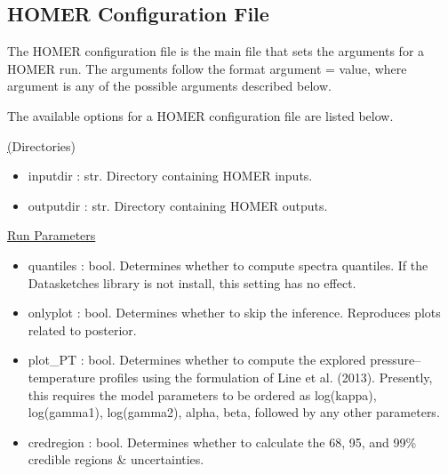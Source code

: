 \documentclass[letterpaper, 12pt]{article}
\begin{document}
\subsection{HOMER Configuration File}
\label{sec:config}
The HOMER configuration file is the main file that sets the arguments for a 
HOMER run. The arguments follow the format {\ttb argument = value}, where 
{\ttb argument} is any of the possible arguments described below. 

\noindent The available options for a HOMER configuration file are listed below.

\noindent \underline(Directories)
\begin{itemize}
\item inputdir   : str.  Directory containing HOMER inputs.
\item outputdir  : str.  Directory containing HOMER outputs.
\end{itemize}

\noindent \underline{Run Parameters}
\begin{itemize}
\item quantiles   : bool. Determines whether to compute spectra quantiles.
                    If the Datasketches library is not install, this setting 
                    has no effect.
\item onlyplot    : bool. Determines whether to skip the inference.
                    Reproduces plots related to posterior.
\item plot\_PT    : bool. Determines whether to compute the explored 
                    pressure--temperature profiles using the formulation of 
                    Line et al. (2013).  Presently, this requires the model 
                    parameters to be ordered as 
                    log(kappa), log(gamma1), log(gamma2), alpha, beta, 
                    followed by any other parameters.
\item credregion  : bool. Determines whether to calculate the 68, 95, and 99\% 
                    credible regions \& uncertainties.
\end{itemize}
\end{document}
